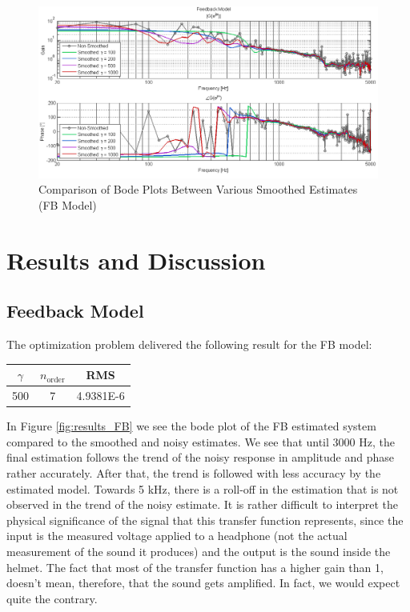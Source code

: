 \begin{figure}[h]
\centering
\includegraphics[width=1.0\textwidth]{pics/FB_Smoothing}
\caption{Comparison of Bode Plots Between Various Smoothed Estimates (FB Model)}
\label{fig:FB_Smoothing}
\end{figure}



\chapter{Results and Discussion}\label{chap: results}

\section{Feedback Model}
The optimization problem delivered the following result for the FB model:

\begin{table}[H]
\centering
\begin{tabular}{c|c|c}
$\gamma$ & $n_\text{order}$ & RMS \\ \hline
500 & 7 & 4.9381E-6 \\ 
\end{tabular}
\end{table}

In Figure \ref{fig:results_FB} we see the bode plot of the FB estimated system compared to the smoothed and noisy estimates. We see that until 3000 Hz, the final estimation follows the trend of the noisy response in amplitude and phase rather accurately. After that, the trend is followed with less accuracy by the estimated model. Towards 5 kHz, there is a roll-off in the estimation that is not observed in the trend of the noisy estimate. It is rather difficult to interpret the physical significance of the signal that this transfer function represents, since the input is the measured voltage applied to a headphone (not the actual measurement of the sound it produces) and the output is the sound inside the helmet. The fact that most of the transfer function has a higher gain than 1, doesn't mean, therefore, that the sound gets amplified. In fact, we would expect quite the contrary. \\


